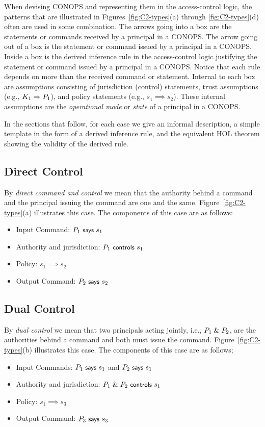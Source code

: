 When devising CONOPS and representing them in the access-control
logic, the patterns that are illustrated in
Figures~\ref{fig:C2-types}(a) through \ref{fig:C2-types}(d) often are
used in some combination. The arrows going into a box are the
statements or commands received by a principal in a CONOPS. The arrow
going out of a box is the statement or command issued by a principal
in a CONOPS. Inside a box is the derived inference rule in the
access-control logic justifying the statement or command issued by a
principal in a CONOPS. Notice that each rule depends on more than the
received command or statement. Internal to each box are assumptions
consisting of jurisdiction (control) statements, trust assumptions
(e.g., $K_1 \Rightarrow P_1$), and policy statements (e.g., $s_1
\implies s_2$). These internal assumptions are the \emph{operational
  mode} or \emph{state} of a principal in a CONOPS.

In the sections that follow, for each case we give an informal
description, a simple template in the form of a derived inference
rule, and the equivalent HOL theorem showing the validity of the
derived rule.

\subsection{Direct Control}
\label{sec:direct-control}

By \emph{direct command and control} we mean that the authority behind
a command and the principal issuing the command are one and the
same. Figure~\ref{fig:C2-types}(a) illustrates this case. The components
of this case are as follows:
\begin{itemize}
\item Input Command: $P_1 \text{\small\textsf{ says }} s_1$
\item Authority and jurisdiction: $P_1 \text{\small\textsf{ controls }} s_1$
\item Policy: $s_1 \implies s_2$
\item Output Command: $P_2 \text{\small\textsf{ says }} s_2$
\end{itemize}


\subsection{Dual Control}
\label{sec:dual-control}

By \emph{dual control} we mean that two principals acting jointly,
i.e., $P_1 \;\&\; P_2$, are the authorities behind a command and both
must issue the command. Figure~\ref{fig:C2-types}(b) illustrates this
case. The components of this case are as follows;
\begin{itemize}
\item Input Commands: $P_1 \text{\small\textsf{ says }} s_1$ and $P_2 \text{\small\textsf{ says }} s_1$
\item Authority and jurisdiction: $P_1 \;\&\; P_2 \text{\small\textsf{ controls }} s_1$
\item Policy: $s_1 \implies s_3$
\item Output Command: $P_3 \text{\small\textsf{ says }} s_3$
\end{itemize}

